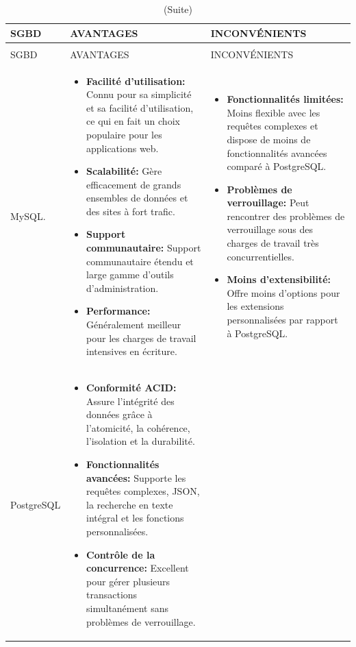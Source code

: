 \documentclass[12pt]{report}
\begin{document}
				\begin{longtable}{|p{3cm}|p{5.5cm}|p{5.5cm}|} 
						\caption{Comparaison entre MySQL et PostgreSQL.} 
						\label{tab:DBcomp}\\ 
						\hline 
						SGBD & AVANTAGES & INCONVÉNIENTS\\ 
						\hline 
						\endfirsthead 	
						\caption[]{(Suite)}\\ 
						\hline 
						SGBD & AVANTAGES & INCONVÉNIENTS\\ 
						\hline 
						\endhead
						MySQL. &
						\begin{itemize}
							\item \textbf{Facilité d'utilisation:} Connu pour sa simplicité et sa facilité d'utilisation, ce qui en fait un choix populaire pour les applications web.
							\item \textbf{Scalabilité:} Gère efficacement de grands ensembles de données et des sites à fort trafic.
							\item \textbf{Support communautaire:} Support communautaire étendu et large gamme d'outils d'administration.
							\item \textbf{Performance:}  Généralement meilleur pour les charges de travail intensives en écriture.
						\end{itemize}
						&
						\begin{itemize}
							\item \textbf{Fonctionnalités limitées:} Moins flexible avec les requêtes complexes et dispose de moins de fonctionnalités avancées comparé à PostgreSQL.
							\item \textbf{Problèmes de verrouillage:} Peut rencontrer des problèmes de verrouillage sous des charges de travail très concurrentielles.
							\item \textbf{Moins d'extensibilité:} Offre moins d'options pour les extensions personnalisées par rapport à PostgreSQL.
						\end{itemize}\\						
						\hline
						PostgreSQL &
						\begin{itemize}
							\item \textbf{Conformité ACID:} Assure l'intégrité des données grâce à l'atomicité, la cohérence, l'isolation et la durabilité.
							\item \textbf{Fonctionnalités avancées:} Supporte les requêtes complexes, JSON, la recherche en texte intégral et les fonctions personnalisées.
							\item \textbf{Contrôle de la concurrence:} Excellent pour gérer plusieurs transactions simultanément sans problèmes de verrouillage.

\end{itemize}
\end{longtable}
\end{document}
